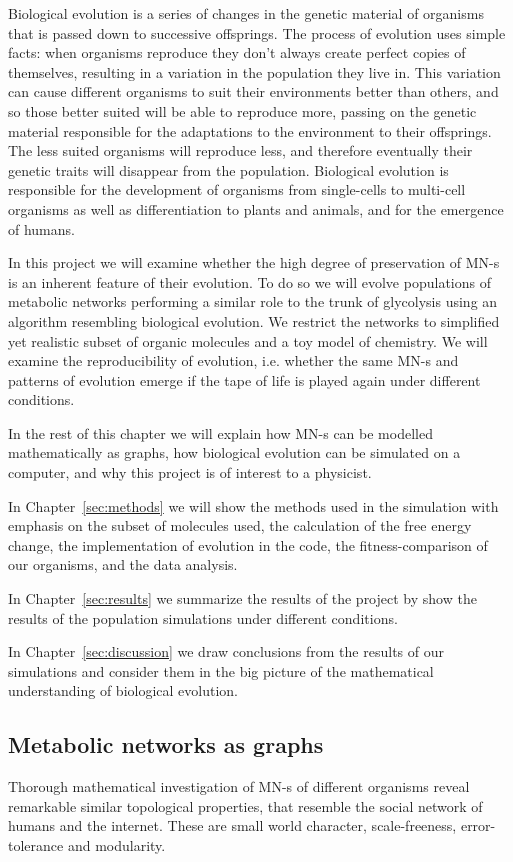 \documentclass[a4paper,12pt]{article}
\begin{document}
	Biological evolution is a series of changes in the genetic material of organisms that is passed down to successive offsprings. The process of evolution uses simple facts: when organisms reproduce they don't always create perfect copies of themselves, resulting in a variation in the population they live in. This variation can cause different organisms to suit their environments better than others, and so those better suited will be able to reproduce more, passing on the genetic material responsible for the adaptations to the environment to their offsprings. The less suited organisms will reproduce less, and therefore eventually their genetic traits will disappear from the population. 
	 Biological evolution is responsible for the development of organisms from single-cells to multi-cell organisms as well as differentiation to plants and animals, and for the emergence of humans. 



	In this project we will examine whether the high degree of preservation  of MN-s is an inherent feature of their evolution. To do so we will evolve populations of metabolic networks performing a similar role to the trunk of glycolysis using an algorithm resembling biological evolution. We restrict the networks to simplified yet realistic subset of organic molecules and a toy model of chemistry. We will examine the reproducibility of evolution, i.e. whether the same MN-s and patterns of evolution emerge if the tape of life is played again under different conditions. 

	In the rest of this chapter we will explain how MN-s can be modelled mathematically as graphs, how biological evolution can be simulated on a computer, and why this project is of interest to a physicist.

	In Chapter~\ref{sec:methods} we  will show the methods used in the simulation with emphasis on the subset of molecules used, the calculation of the free energy change, the implementation of evolution in the code, the fitness-comparison of our organisms, and the data analysis. 

	In Chapter~\ref{sec:results} we summarize the results of the project by show the results of the population simulations under different conditions.


	In Chapter~\ref{sec:discussion} we draw conclusions from the results of our simulations and consider them in the big picture of the mathematical understanding of biological evolution. 

	
	\subsection{Metabolic networks as graphs}
	Thorough mathematical investigation of MN-s of different organisms reveal remarkable similar topological properties, that resemble the social network of humans and the internet. These are small world character, scale-freeness, error-tolerance and modularity\cite{largescale}.	
\end{document}
